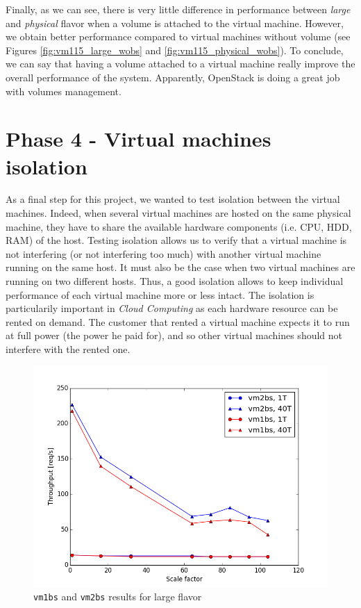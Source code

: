 Finally, as we can see, there is very little difference in performance between \textit{large} and \textit{physical} flavor when a volume is attached to the virtual machine. 
However, we obtain better performance compared to virtual machines without volume (see Figures \ref{fig:vm115_large_wobs} and \ref{fig:vm115_physical_wobs}). 
To conclude, we can say that having a volume attached to a virtual machine really improve the overall performance of the system.
Apparently, OpenStack is doing a great job with volumes management.




\section{Phase 4 - Virtual machines isolation}

As a final step for this project, we wanted to test isolation between the virtual machines.
Indeed, when several virtual machines are hosted on the same physical machine, they have to share the available hardware components (i.e. CPU, HDD, RAM) of the host.
Testing isolation allows us to verify that a virtual machine is not interfering (or not interfering too much) with another virtual machine running on the same host. 
It must also be the case when two virtual machines are running on two different hosts. 
Thus, a good isolation allows to keep individual performance of each virtual machine more or less intact.
The isolation is particularily important in \textit{Cloud Computing} as each hardware resource can be rented on demand. 
The customer that rented a virtual machine expects it to run at full power (the power he paid for), and so other virtual machines should not interfere with the rented one.

\begin{figure}[h]
	\centering
	\includegraphics[scale=0.5]{figures/results/vm_large_iso.png}
	\caption{\texttt{vm1bs} and \texttt{vm2bs} results for large flavor}
	\label{fig:vm_large_iso}
\end{figure}

